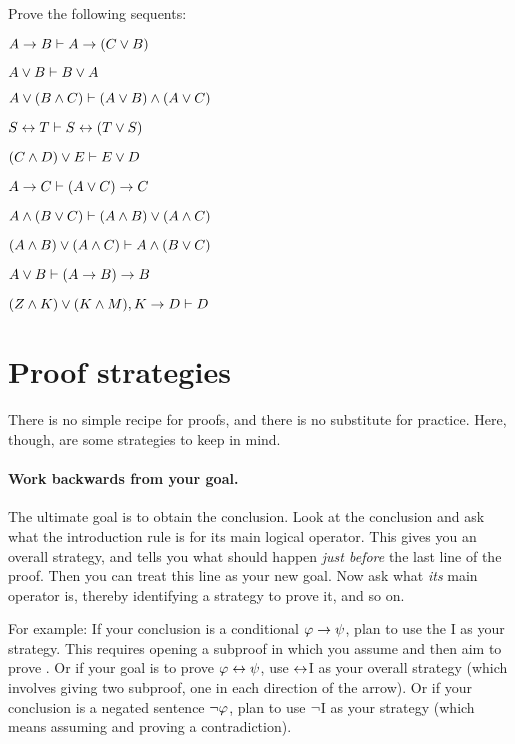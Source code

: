 \practiceproblems

\problempart
Prove the following sequents:

\begin{earg}

\item $A \rightarrow B \vdash A \rightarrow (C \vee B)$
\item $A \vee B \vdash B \vee A$
\item $A \vee (B \wedge C) \vdash (A \vee B) \wedge (A \vee C)$
\item $S\leftrightarrow T \vdash S\leftrightarrow (T\vee S)$
\item $(C\wedge D)\vee E \vdash E\vee D$
\item $A \rightarrow C \vdash (A \vee C) \rightarrow C$
\item $ A \wedge (B \vee C) \vdash (A \wedge B) \vee (A \wedge C)$
\item $  (A \wedge B) \vee (A \wedge C) \vdash  A \wedge (B \vee C)$
\item $A \vee B \vdash (A \rightarrow B) \rightarrow B$
\item $(Z\wedge K) \vee (K\wedge M), K \rightarrow D \vdash D$
\end{earg}



\section{Proof strategies}\label{s:ProofStrategies}
There is no simple recipe for proofs, and there is no substitute for practice. Here, though, are some strategies to keep in mind.

\paragraph{Work backwards from your goal.}
The ultimate goal is to obtain the conclusion. Look at the conclusion and ask what the introduction rule is for its main logical operator. This gives you an overall strategy, and tells you what should happen \emph{just before} the last line of the proof. Then you can treat this line as your new goal. Now ask what \emph{its} main operator is, thereby identifying a strategy to prove it, and so on.


For example: If your conclusion is a conditional $\mathcal{\varphi}\rightarrow\mathcal{\psi}$, plan to use the {\eif}I as your strategy. This requires opening a subproof in which you assume \meta{\varphi} and then aim to prove \meta{\psi}.  Or if your goal is to prove $\mathcal{\varphi} \leftrightarrow \mathcal{\psi}$, use $\leftrightarrow$I as your overall strategy (which involves giving two subproof, one in each direction of the arrow). Or if your conclusion is a negated sentence $\neg \mathcal{\varphi}$, plan to use $\neg$I as your strategy (which means assuming \meta{\varphi} and proving a contradiction).


